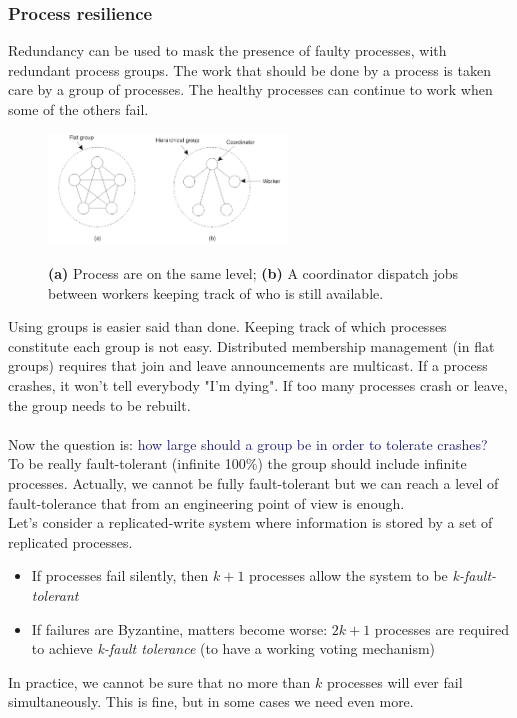 \documentclass[10pt,a4paper]{article}
\begin{document}
\subsubsection{Process resilience}
Redundancy can be used to mask the presence of faulty processes, with redundant process groups. The work that should be done by a process is taken care by a group of processes. The healthy processes can continue to work when some of the others fail.
\begin{figure}[h!]
\hfill \includegraphics[width=180pt]{images/process-groups.png}\hspace*{\fill}
  \label{fig:process-groups}
  \caption{\textbf{(a)} Process are on the same level; \textbf{(b)} A coordinator dispatch jobs between workers keeping track of who is still available. }
\end{figure}
Using groups is easier said than done. Keeping track of which processes constitute each group is not easy. Distributed membership management (in flat groups) requires that join and leave announcements are multicast. If a process crashes, it won't tell everybody "I'm dying". If too many processes crash or leave, the group needs to be rebuilt. \\ \\
Now the question is: \textcolor{MidnightBlue}{how large should a group be in order to tolerate crashes?} \\
To be really fault-tolerant (infinite 100\%) the group should include infinite processes. Actually, we cannot be fully fault-tolerant but we can reach a level of fault-tolerance that from an engineering point of view is enough. \\
Let's consider a replicated-write system where information is stored by a set of replicated processes.
\begin{itemize}
	\item If processes fail silently, then $k+1$ processes allow the system to be \textit{k-fault-tolerant}
	\item If failures are Byzantine, matters become worse: $2k+1$ processes are required to achieve \textit{k-fault tolerance} (to have a working voting mechanism)
\end{itemize}
In practice, we cannot be sure that no more than $k$ processes will ever fail simultaneously. This is fine, but in some cases we need even more.
\end{document}
